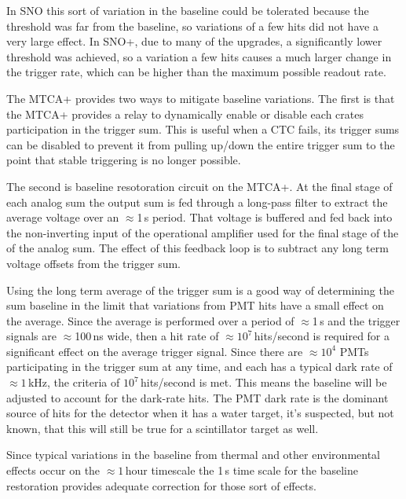 In SNO this sort of variation in the baseline could be tolerated because
the threshold was far from the baseline, so variations of a few hits
did not have a very large effect.
In SNO+, due to many of the upgrades, a significantly lower threshold was achieved,
so a variation a few hits causes a much larger change in the trigger rate, which
can be higher than the maximum possible readout rate.

The MTCA+ provides two ways to mitigate baseline variations.
The first is that the MTCA+ provides a relay to dynamically enable or disable each
crates participation in the trigger sum.
This is useful when a CTC fails, its trigger sums can be disabled to prevent it from
pulling up/down the entire trigger sum to the point that stable triggering is no
longer possible.

The second is baseline resotoration circuit on the MTCA+. At the final
stage of each analog sum the output sum is fed through a long-pass
filter to extract the average voltage over an $\approx$1\,s period.
That voltage is buffered and fed back into the non-inverting input
of the operational amplifier used for the final stage of the
of the analog sum.
The effect of this feedback loop is to subtract any long term
voltage offsets from the trigger sum.

Using the long term average of the trigger sum is a good way of
determining the sum baseline in the limit that variations from
PMT hits have a small effect on the average.
Since the average is performed over a period of $\approx$1\,s
and the trigger signals are $\approx$100\,ns wide, then a hit
rate of $\approx 10^7$\,hits/second is required for a significant
effect on the average trigger signal.
Since there are $\approx10^4$ PMTs participating in the trigger sum
at any time, and each has a typical dark rate of $\approx1$\,kHz, the
criteria of $10^7$\,hits/second is met.
This means the baseline will be adjusted to account for the dark-rate hits.
The PMT dark rate is the dominant source of hits for the detector when it has
a water target, it's suspected, but not known, that this will still be true for
a scintillator target as well.

Since typical variations in the baseline from thermal and other environmental
effects occur on the $\approx1$\,hour timescale the 1\,s time scale for the
baseline restoration provides adequate correction for those sort of effects.


